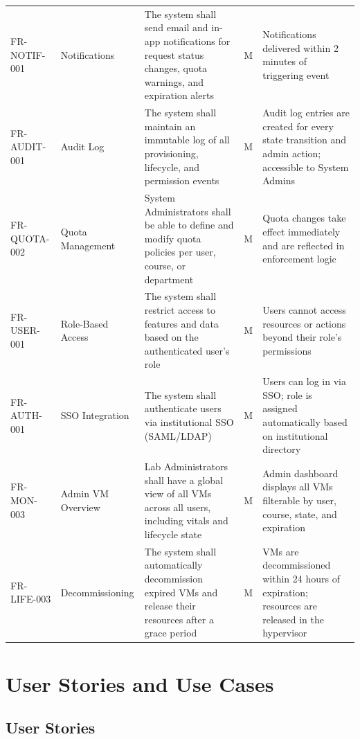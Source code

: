 \documentclass[12pt,letterpaper]{article}
\begin{document}
\begin{longtable}{L{2.4cm} L{2.4cm} L{5cm} C{1.2cm} L{3.5cm}}
  \addlinespace
  FR-NOTIF-001 & Notifications & The system shall send email and in-app notifications for request status changes, quota warnings, and expiration alerts & M & Notifications delivered within 2 minutes of triggering event \\
  \addlinespace
  FR-AUDIT-001 & Audit Log & The system shall maintain an immutable log of all provisioning, lifecycle, and permission events & M & Audit log entries are created for every state transition and admin action; accessible to System Admins \\
  \addlinespace
  FR-QUOTA-002 & Quota Management & System Administrators shall be able to define and modify quota policies per user, course, or department & M & Quota changes take effect immediately and are reflected in enforcement logic \\
  \addlinespace
  FR-USER-001 & Role-Based Access & The system shall restrict access to features and data based on the authenticated user's role & M & Users cannot access resources or actions beyond their role's permissions \\
  \addlinespace
  FR-AUTH-001 & SSO Integration & The system shall authenticate users via institutional SSO (SAML/LDAP) & M & Users can log in via SSO; role is assigned automatically based on institutional directory \\
  \addlinespace
  FR-MON-003 & Admin VM Overview & Lab Administrators shall have a global view of all VMs across all users, including vitals and lifecycle state & M & Admin dashboard displays all VMs filterable by user, course, state, and expiration \\
  \addlinespace
  FR-LIFE-003 & Decommissioning & The system shall automatically decommission expired VMs and release their resources after a grace period & M & VMs are decommissioned within 24 hours of expiration; resources are released in the hypervisor \\
\end{longtable}

\section{User Stories and Use Cases}

\subsection{User Stories}
\end{document}
